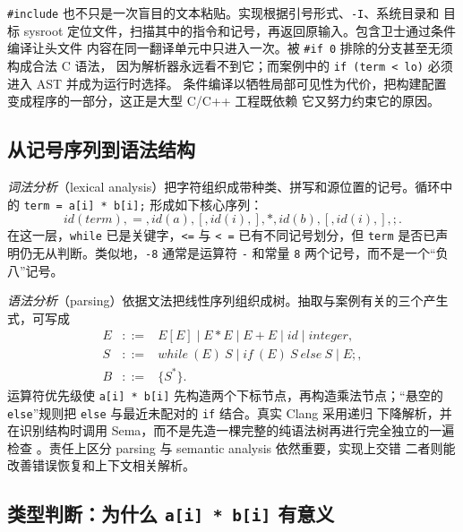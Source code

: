 \texttt{\#include} 也不只是一次盲目的文本粘贴。实现根据引号形式、\texttt{-I}、系统目录和
目标 sysroot 定位文件，扫描其中的指令和记号，再返回原输入。包含卫士通过条件编译让头文件
内容在同一翻译单元中只进入一次。被 \texttt{\#if 0} 排除的分支甚至无须构成合法 C 语法，
因为解析器永远看不到它；而案例中的 \texttt{if (term < lo)} 必须进入 AST 并成为运行时选择。
条件编译以牺牲局部可见性为代价，把构建配置变成程序的一部分，这正是大型 C/C++ 工程既依赖
它又努力约束它的原因。

\subsection{从记号序列到语法结构}

\emph{词法分析}（lexical analysis）把字符组织成带种类、拼写和源位置的记号。循环中的
\texttt{term = a[i] * b[i];} 形成如下核心序列：
\[
 \mathit{id}(term),=,\mathit{id}(a),[,\mathit{id}(i),],*,
 \mathit{id}(b),[,\mathit{id}(i),],;.
\]
在这一层，\texttt{while} 已是关键字，\texttt{<=} 与 \texttt{< =} 已有不同记号划分，但
\texttt{term} 是否已声明仍无从判断。类似地，\texttt{-8} 通常是运算符 \texttt{-} 和常量
\texttt{8} 两个记号，而不是一个“负八”记号。

\emph{语法分析}（parsing）依据文法把线性序列组织成树。抽取与案例有关的三个产生式，可写成
\[
\begin{array}{rcl}
E &::=& E[E]\mid E*E\mid E+E\mid \mathit{id}\mid \mathit{integer},\\
S &::=& \mathit{while}\ (E)\ S\mid \mathit{if}\ (E)\ S\ \mathit{else}\ S
       \mid E;,\\
B &::=& \{S^*\}.
\end{array}
\]
运算符优先级使 \texttt{a[i] * b[i]} 先构造两个下标节点，再构造乘法节点；“悬空的
\texttt{else}”规则把 \texttt{else} 与最近未配对的 \texttt{if} 结合。真实 Clang 采用递归
下降解析，并在识别结构时调用 Sema，而不是先造一棵完整的纯语法树再进行完全独立的一遍检查
\cite{front-clang-internals}。责任上区分 parsing 与 semantic analysis 依然重要，实现上交错
二者则能改善错误恢复和上下文相关解析。

\subsection{类型判断：为什么 \texttt{a[i] * b[i]} 有意义}

